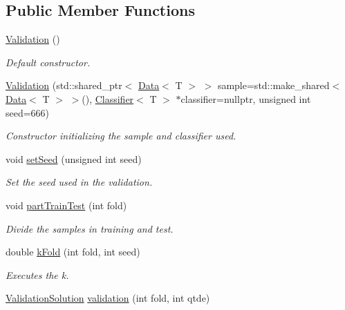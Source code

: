 \subsection*{Public Member Functions}
\begin{DoxyCompactItemize}
\item 
\hyperlink{class_validation_a8421390022d90bebecf761d23533c72e}{Validation} ()\hypertarget{class_validation_a8421390022d90bebecf761d23533c72e}{}\label{class_validation_a8421390022d90bebecf761d23533c72e}

\begin{DoxyCompactList}\small\item\em Default constructor. \end{DoxyCompactList}\item 
\hyperlink{class_validation_a91399f8b544cb22de02b85618ef5b0cc}{Validation} (std\+::shared\+\_\+ptr$<$ \hyperlink{class_data}{Data}$<$ T $>$ $>$ sample=std\+::make\+\_\+shared$<$ \hyperlink{class_data}{Data}$<$ T $>$ $>$(), \hyperlink{class_classifier}{Classifier}$<$ T $>$ $\ast$classifier=nullptr, unsigned int seed=666)
\begin{DoxyCompactList}\small\item\em Constructor initializing the sample and classifier used. \end{DoxyCompactList}\item 
void \hyperlink{class_validation_a26fec6a8582bded0583a4754cdba0009}{set\+Seed} (unsigned int seed)
\begin{DoxyCompactList}\small\item\em Set the seed used in the validation. \end{DoxyCompactList}\item 
void \hyperlink{class_validation_a1e9580697a164d4bfbe721f2f1589c57}{part\+Train\+Test} (int fold)
\begin{DoxyCompactList}\small\item\em Divide the samples in training and test. \end{DoxyCompactList}\item 
double \hyperlink{class_validation_a1a5825e2dd051a72aaffd423a0df55f1}{k\+Fold} (int fold, int seed)
\begin{DoxyCompactList}\small\item\em Executes the k. \end{DoxyCompactList}\item 
\hyperlink{class_validation_solution}{Validation\+Solution} \hyperlink{class_validation_aa7f79be36229a955f67a29556152f373}{validation} (int fold, int qtde)

\end{DoxyCompactItemize}
